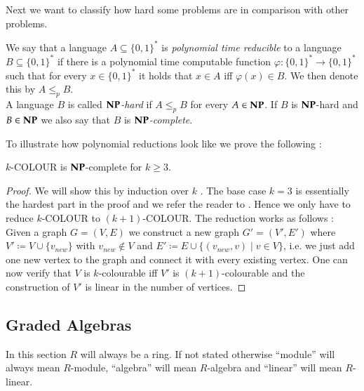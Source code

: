 Next we want to classify how hard some problems are in comparison with other problems.

\begin{Definition}
 We say that a language $A \subseteq {\lbrace 0,1 \rbrace}^*$ is \emph{polynomial time reducible} to a language 
 $B \subseteq {\lbrace 0,1 \rbrace}^*$ if there is a polynomial time computable function 
 ${\varphi \colon {\lbrace 0,1 \rbrace}^* \to {\lbrace 0,1 \rbrace}^*}$ such that for every $x \in {\lbrace 0,1 \rbrace}^*$ 
 it holds that $x \in A$ iff $\varphi (x) \in B$. We then denote this by $ A \leq_p B$. \\
 A language $B$ is called \emph{$\mathbf{NP}$-hard} if $A \leq_p B$ for every $A \in \mathbf{NP}$. If $B$ is $\mathbf{NP}$-hard
 and $B \in \mathbf{NP}$ we also say that $B$ is \emph{$\mathbf{NP}$-complete}.
\end{Definition}

To illustrate how polynomial reductions look like we prove the following :

\begin{Theorem}
  $k$-COLOUR is $\mathbf{NP}$-complete for $k \geq 3$.
\end{Theorem}

\begin{proof}
 We will show this by induction over $k$ .
 The base case $k = 3$ is essentially the hardest part in the proof and we refer the reader to \cite{Rothe2005}.
 Hence we only have to reduce $k$-COLOUR to $(k+1)$-COLOUR. The reduction works as follows :
 Given a graph $G = (V,E)$ we construct a new graph $G' = (V', E')$ where $V' \coloneqq V \cup \lbrace v_{new} \rbrace$ with
 $v_{new} \notin V$ and $E' \coloneqq E \cup \lbrace (v_{new}, v) \; | \; v \in V \rbrace$, i.e. we just add one new vertex to the graph
 and connect it with every existing vertex. One can now verify that $V$ is $k$-colourable iff $V'$ is $(k+1)$-colourable and the
 construction of $V'$ is linear in the number of vertices.
 
\end{proof}

 
\subsection{Graded Algebras}

In this section $R$ will always be a ring. If not stated otherwise ``module'' will
always mean $R$-module, ``algebra'' will mean $R$-algebra and ``linear'' will mean $R$-linear.

